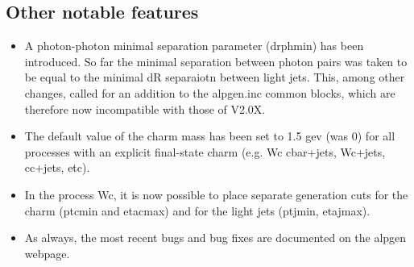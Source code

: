 \documentclass[paper]{JHEP3}
\begin{document}
\begin{appendix}
\subsection{Other notable features}
\begin{itemize}
\item A photon-photon minimal separation parameter (drphmin) has been
introduced. So far the minimal separation between photon pairs was
taken to be equal to the minimal dR separaiotn between light
jets. This, among other changes, called for an addition to the
alpgen.inc common blocks, which are therefore now incompatible with
those of V2.0X.  
\item The default value of the charm mass has been set to
1.5 gev (was 0) for all processes with an explicit final-state charm
(e.g. Wc cbar+jets, Wc+jets, cc+jets, etc). 
\item In the process Wc, it is
now possible to place separate generation cuts for the charm (ptcmin
and etacmax) and for the light jets (ptjmin, etajmax).
\item As always, the most recent bugs and bug fixes are documented on
  the alpgen webpage.
\end{itemize}


\end{appendix}
\end{document}
